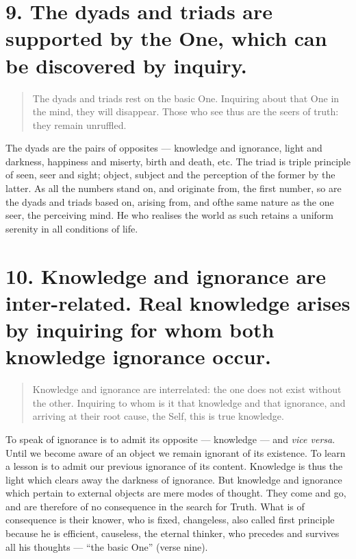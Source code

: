 \documentclass[12pt]{report}
\begin{document}
\section{9. The dyads and triads are supported by the One, which can
  be discovered by inquiry.}

\begin{quote}
  The dyads and triads rest on the basic One. Inquiring about that One
  in the mind, they will disappear. Those who see thus are the seers of
  truth: they remain unruffled.
\end{quote}


The dyads are the pairs of opposites --- knowledge and ignorance,
light and darkness, happiness and miserty, birth and death, etc. The
triad is triple principle of seen, seer and sight; object, subject and
the perception of the former by the latter. As all the numbers stand
on, and originate from, the first number, so are the dyads and triads
based on, arising from, and ofthe same nature as the one seer, the
perceiving mind. He who realises the world as such retains a uniform
serenity in all conditions of life.


\section{10. Knowledge and ignorance are inter-related. Real knowledge
arises by inquiring for whom both knowledge ignorance occur.}

\begin{quote}
  Knowledge and ignorance are interrelated: the one does not exist
  without the other. Inquiring to whom is it that knowledge and that
  ignorance, and arriving at their root cause, the Self, this is true
  knowledge. 
\end{quote}


To speak of ignorance is to admit its opposite --- knowledge --- and
\emph{vice versa}. Until we become aware of an object we remain
ignorant of its existence. To learn a lesson is to admit our previous
ignorance of its content. Knowledge is thus the light which clears
away the darkness of ignorance. But knowledge and ignorance which
pertain to external objects are mere modes of thought. They come and
go, and are therefore of no consequence in the search for Truth. What
is of consequence is their knower, who is fixed, changeless, also
called first principle because he is efficient, causeless, the eternal
thinker, who precedes and survives all his thoughts --- ``the basic
One'' (verse nine).
\end{document}

